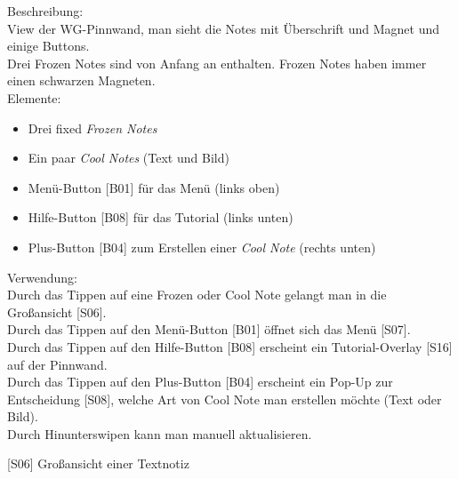 \documentclass[a4paper]{scrreprt}
\begin{document}
    	Beschreibung: \\
    	View der WG-Pinnwand, man sieht die Notes mit Überschrift und Magnet und einige Buttons. \\ Drei Frozen Notes sind von Anfang an enthalten. Frozen Notes haben immer einen schwarzen Magneten.
    	\\
    	\newline
    	Elemente:
    	\begin{itemize}
    		\renewcommand\labelitemi{--}
    		\item  Drei fixed \textit{Frozen Notes}
    		\item Ein paar \textit{Cool Notes} (Text und Bild)
    		\item Menü-Button {[}B01{]} für das Menü (links oben)
    		\item Hilfe-Button {[}B08{]} für das Tutorial (links unten)
    		\item Plus-Button {[}B04{]} zum Erstellen einer \textit{Cool Note}
    		(rechts unten)
    		
    	\end{itemize}
    
    	\hfill
    	
    	Verwendung:\\
    	Durch das Tippen auf eine Frozen oder Cool
    	Note gelangt man in die Großansicht {[}S06{]}.
    	\\
    	Durch das Tippen auf den Menü-Button {[}B01{]} 
    	öffnet sich das Menü {[}S07{]}.\\
    	Durch das Tippen auf den Hilfe-Button  {[}B08{]} erscheint
    	ein Tutorial-Overlay {[}S16{]} auf der Pinnwand.	\\
    	Durch das Tippen auf den  Plus-Button [B04]  erscheint 
    	ein Pop-Up zur Entscheidung {[}S08{]}, welche Art von Cool Note man erstellen möchte (Text oder
    	Bild).\\
    	Durch Hinunterswipen kann man manuell aktualisieren.
    	
    	\clearpage
    	
    	{[}S06{]} Großansicht einer Textnotiz \\
    	
\end{document}
